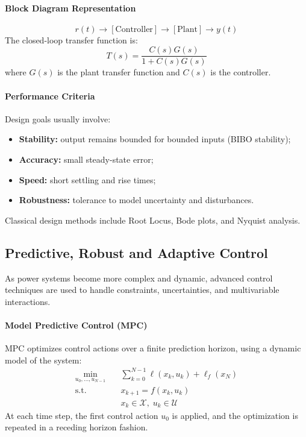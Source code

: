 \documentclass[11pt]{article}
\begin{document}
	\paragraph{Block Diagram Representation}
	\[
	r(t) \longrightarrow [\text{Controller}] \longrightarrow [\text{Plant}] \longrightarrow y(t)
	\]
	The closed-loop transfer function is:
	\[
	T(s) = \frac{C(s) G(s)}{1 + C(s) G(s)}
	\]
	where $G(s)$ is the plant transfer function and $C(s)$ is the controller.
	
	\paragraph{Performance Criteria}
	Design goals usually involve:
	\begin{itemize}
		\item \textbf{Stability:} output remains bounded for bounded inputs (BIBO stability);
		\item \textbf{Accuracy:} small steady-state error;
		\item \textbf{Speed:} short settling and rise times;
		\item \textbf{Robustness:} tolerance to model uncertainty and disturbances.
	\end{itemize}
	
	Classical design methods include Root Locus, Bode plots, and Nyquist analysis.
	
	\subsection{Predictive, Robust and Adaptive Control}
	
	As power systems become more complex and dynamic, advanced control techniques are used to handle constraints, uncertainties, and multivariable interactions.
	
	\paragraph{Model Predictive Control (MPC)}
	
	MPC optimizes control actions over a finite prediction horizon, using a dynamic model of the system:
	\[
	\begin{aligned}
		\min_{u_0, \ldots, u_{N-1}} \quad & \sum_{k=0}^{N-1} \ell(x_k, u_k) + \ell_f(x_N) \\
		\text{s.t.} \quad & x_{k+1} = f(x_k, u_k) \\
		& x_k \in \mathcal{X}, \; u_k \in \mathcal{U}
	\end{aligned}
	\]
	At each time step, the first control action $u_0$ is applied, and the optimization is repeated in a receding horizon fashion.
	
\end{document}
